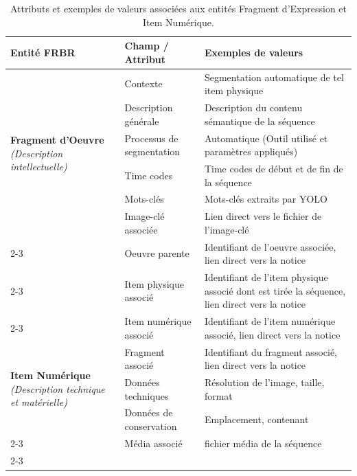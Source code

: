 \begin{table}[H]
	\centering
	\small
	\renewcommand{\arraystretch}{1.3}
	\begin{tabular}{|p{3.8cm}|p{4.2cm}|p{6.4cm}|}
		\hline
		\textbf{Entité FRBR} & \textbf{Champ / Attribut} & \textbf{Exemples de valeurs} \\
		\hline
		\multirow{6}{=}{\textbf{Fragment d’Oeuvre} \newline \textit{(Description intellectuelle)}} 
		& Contexte & Segmentation automatique de tel item physique \\ \cline{2-3}
		& Description générale & Description du contenu sémantique de la séquence \\ \cline{2-3}
		& Processus de segmentation & Automatique (Outil utilisé et paramètres appliqués) \\ \cline{2-3}
		& Time codes & Time codes de début et de fin de la séquence \\ \cline{2-3}
		& Mots-clés & Mots-clés extraits par YOLO \\ \cline{2-3}
		& Image-clé associée & Lien direct vers le fichier de l'image-clé \\ \cline{2-3}
		& Oeuvre parente & Identifiant de l'oeuvre associée, lien direct vers la notice \\ \cline{2-3}
		& Item physique associé & Identifiant de l'item physique associé dont est tirée la séquence, lien direct vers la notice \\ \cline{2-3}
		& Item numérique associé & Identifiant de l'item numérique associé, lien direct vers la notice \\ 
		\hline
		\multirow{3}{=}{\textbf{Item Numérique} \newline \textit{(Description technique et matérielle)}} 
		& Fragment associé & Identifiant du fragment associé, lien direct vers la notice \\ \cline{2-3}
		& Données techniques & Résolution de l'image, taille, format \\ \cline{2-3}
		& Données de conservation & Emplacement, contenant \\ \cline{2-3}
		& Média associé & fichier média de la séquence \\ \cline{2-3}
		\hline
	\end{tabular}
	\caption{Attributs et exemples de valeurs associées aux entités Fragment d'Expression et Item Numérique.}
	\label{tab:reversement_metadonnees_frbr}
\end{table}

